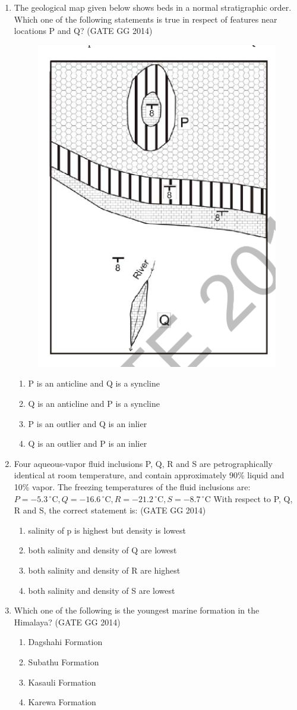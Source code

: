 \documentclass[journal]{IEEEtran}
\begin{document}
\begin{enumerate}[start=1]
\item The geological map given below shows beds in a normal stratigraphic order. Which one of the following statements is true in respect of features near locations P and Q?
\hfill(GATE GG 2014)
\begin{figure}[H]
    \centering
    \includegraphics[width=0.32\columnwidth]{figs/07.png} 
    \caption{}
    \label{fig:48}
\end{figure}
\begin{enumerate}
    \item P is an anticline and Q is a syncline
    \item Q is an anticline and P is a syncline
    \item P is an outlier and Q is an inlier
    \item Q is an outlier and P is an inlier
\end{enumerate}

\item Four aqueous-vapor fluid inclusions P, Q, R and S are petrographically identical at room temperature, and contain approximately 90\% liquid and 10\% vapor. The freezing temperatures of the fluid inclusions are:  $P = -5.3\, ^\circ\text{C},  Q = -16.6\, ^\circ\text{C},  R = -21.2\, ^\circ\text{C},  S = -8.7\, ^\circ\text{C}$
With respect to P, Q, R and S, the correct statement is:
\hfill(GATE GG 2014)
\begin{enumerate}
    \item salinity of p is highest but density is lowest
    \item both salinity and density of Q are lowest
    \item both salinity and density of R are highest
    \item both salinity and density of S are lowest
\end{enumerate}

\item Which one of the following is the youngest marine formation in the Himalaya?  
\hfill(GATE GG 2014)
\begin{multicols}{2}
\begin{enumerate}
    \item Dagshahi Formation
    \item Subathu Formation
    \item Kasauli Formation
    \item Karewa Formation
\end{enumerate}
\end{multicols}


\end{enumerate}
\end{document}
